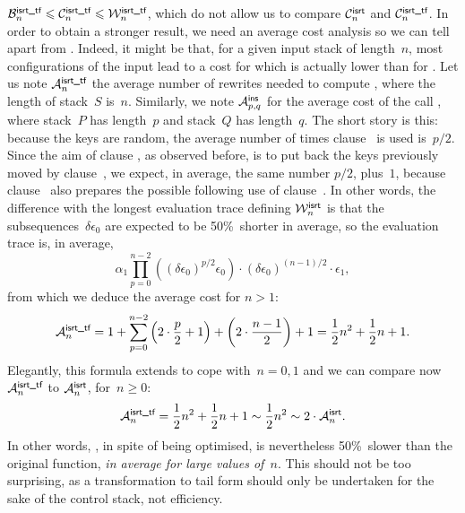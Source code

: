 \(\B{\smash[t]{\fun{isrt\_tf}}}{n} \leqslant
\C{\smash[t]{\fun{isrt\_tf}}}{n} \leqslant
\W{\smash[t]{\fun{isrt\_tf}}}{n}\), which do not allow us to compare
\(\C{\fun{isrt}}{n}\) and \(\C{\smash[t]{\fun{isrt\_tf}}}{n}\). In
order to obtain a stronger result, we need an average cost analysis so
we can tell apart  from . Indeed,
it might be that, for a given input stack of length~\(n\), most
configurations of the input lead to a cost for 
which is actually lower than for . Let us note
\(\M{\smash[t]{\fun{isrt\_tf}}}{n}\) the average number of rewrites
needed to compute , where the length of
stack~\(S\) is~\(n\). Similarly, we note \(\M{\fun{ins}}{p,q}\) for
the average cost of the call , where
stack~\(P\) has length~\(p\) and stack~\(Q\) has length~\(q\). The
short story is this: because the keys are random, the average number
of times clause~\clause{\delta} is used is~\(p/2\). Since the aim of
clause , as observed before, is to put back the
keys previously moved by clause~\clause{\delta}, we expect, in
average, the same number \(p/2\), plus~\(1\), because
clause~ also prepares the possible following use of
clause~\clause{\delta}. In other words, the difference with the
longest evaluation trace defining \(\W{\fun{isrt}}{n}\) is that the
subsequences~\(\delta\epsilon_0\) are expected to be 50\%~shorter in
average, so the evaluation trace is, in average,
\begin{equation*}
\alpha_1\prod_{p=0}^{n-2}{\left((\delta\epsilon_0)^{p/2}\epsilon_0\right)}
\cdot (\delta\epsilon_0)^{(n-1)/2} \cdot \epsilon_1,
\end{equation*}
from which we deduce the average cost for \(n>1\):
\begin{equation*}
  \M{\fun{isrt\_tf}}{n} = 1 +
  \sum_{p=0}^{n-2}{\left(2\cdot\frac{p}{2}+1\right)}
                       + \left(2\cdot\frac{n-1}{2}\right) + 1
                     = \frac{1}{2}{n^2} + \frac{1}{2}{n} + 1.
\end{equation*}
Elegantly, this formula extends to cope with~\(n=0,1\) and we can
compare now \(\M{\fun{isrt\_tf}}{n}\) to \(\M{\fun{isrt}}{n}\),
for~\(n\geqslant{}0\):
\begin{equation*}
\M{\fun{isrt\_tf}}{n}
  = \frac{1}{2}{n^2} + \frac{1}{2}{n} + 1
  \sim \frac{1}{2}{n^2} \sim 2 \cdot \M{\fun{isrt}}{n}.
\end{equation*}
In other words, , in spite of being optimised, is
nevertheless 50\%~slower than the original function, \emph{in average
  for large values of~\(n\)}. This should not be too surprising, as
a transformation to tail form should only be undertaken for the sake
of the control stack, not efficiency.

